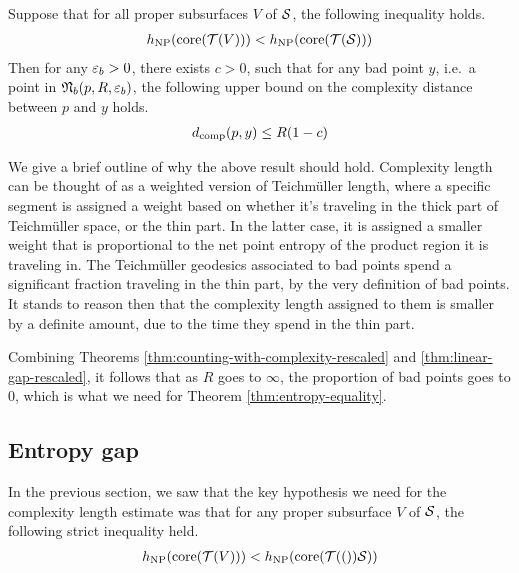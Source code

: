 \begin{theorem}
  \label{thm:linear-gap-rescaled}
  Suppose that for all proper subsurfaces $V$ of $\mathcal{S}$, the following inequality holds.
  \begin{align*}
    h_{\mathrm{NP}}(\mathrm{core}(\mathcal{T}(V))) < h_{\mathrm{NP}}(\mathrm{core}(\mathcal{T}(\mathcal{S})))
  \end{align*}
  Then for any $\varepsilon_b >0$, there exists $c > 0$, such that for any bad point $y$, i.e.\ a point in $\mathfrak{N}_b(p, R, \varepsilon_b)$, the following upper bound on the complexity distance between $p$ and $y$ holds.
  \begin{align*}
    d_{\mathrm{comp}}(p, y) \leq R(1 - c)
  \end{align*}
\end{theorem}
\begin{remark}
  We give a brief outline of why the above result should hold.
  Complexity length can be thought of as a weighted version of Teichmüller length, where a specific segment is assigned a weight based on whether it's traveling in the thick part of Teichmüller space, or the thin part.
  In the latter case, it is assigned a smaller weight that is proportional to the net point entropy of the product region it is traveling in.
  The Teichmüller geodesics associated to bad points spend a significant fraction traveling in the thin part, by the very definition of bad points.
  It stands to reason then that the complexity length assigned to them is smaller by a definite amount, due to the time they spend in the thin part.
\end{remark}

Combining Theorems \ref{thm:counting-with-complexity-rescaled} and \ref{thm:linear-gap-rescaled}, it follows that as $R$ goes to $\infty$, the proportion of bad points goes to $0$, which is what we need for Theorem \ref{thm:entropy-equality}.

\subsection{Entropy gap}
\label{sec:entr-gap-cons}

In the previous section, we saw that the key hypothesis we need for the complexity length estimate was that for any proper subsurface $V$ of $\mathcal{S}$, the following strict inequality held.
\begin{align}
  \label{eq:net-point-entropy-gap}
  h_{\mathrm{NP}}(\mathrm{core}(\mathcal{T}(V))) < h_{\mathrm{NP}}(\mathrm{core}(\mathcal{T}(())\mathcal{S}))
\end{align}

